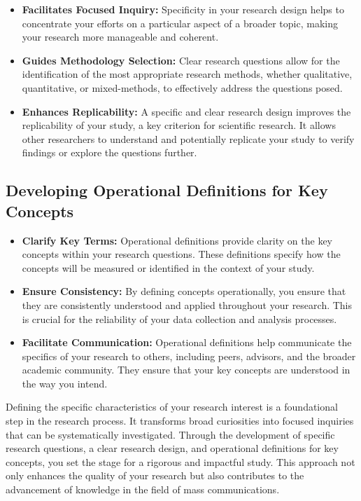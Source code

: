 \documentclass[
]{book}
\begin{document}
\begin{itemize}
\item
  \textbf{Facilitates Focused Inquiry:} Specificity in your research design helps to concentrate your efforts on a particular aspect of a broader topic, making your research more manageable and coherent.
\item
  \textbf{Guides Methodology Selection:} Clear research questions allow for the identification of the most appropriate research methods, whether qualitative, quantitative, or mixed-methods, to effectively address the questions posed.
\item
  \textbf{Enhances Replicability:} A specific and clear research design improves the replicability of your study, a key criterion for scientific research. It allows other researchers to understand and potentially replicate your study to verify findings or explore the questions further.
\end{itemize}

\hypertarget{developing-operational-definitions-for-key-concepts}{%
\subsection*{Developing Operational Definitions for Key Concepts}\label{developing-operational-definitions-for-key-concepts}}

\begin{itemize}
\item
  \textbf{Clarify Key Terms:} Operational definitions provide clarity on the key concepts within your research questions. These definitions specify how the concepts will be measured or identified in the context of your study.
\item
  \textbf{Ensure Consistency:} By defining concepts operationally, you ensure that they are consistently understood and applied throughout your research. This is crucial for the reliability of your data collection and analysis processes.
\item
  \textbf{Facilitate Communication:} Operational definitions help communicate the specifics of your research to others, including peers, advisors, and the broader academic community. They ensure that your key concepts are understood in the way you intend.
\end{itemize}

Defining the specific characteristics of your research interest is a foundational step in the research process. It transforms broad curiosities into focused inquiries that can be systematically investigated. Through the development of specific research questions, a clear research design, and operational definitions for key concepts, you set the stage for a rigorous and impactful study. This approach not only enhances the quality of your research but also contributes to the advancement of knowledge in the field of mass communications.
\end{document}
